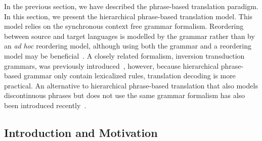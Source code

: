 \begin{sloppy} %

In the previous section, we have described the
phrase-based translation paradigm.
In this section, we present the
hierarchical phrase-based translation
model. This model relies on the synchronous
context free grammar formalism. Reordering
between source and target languages is modelled
by the grammar rather than by an \emph{ad} \emph{hoc}
reordering model, although using both the grammar
and a reordering model may be
beneficial~\citep{huck-EtAl:2013:WMT}.
A closely related formalism, inversion
transduction grammars, was previously
introduced~\citep{wu:1995:IJCAI,wu:1997:CL}, however, because hierarchical
phrase-based grammar only contain lexicalized rules, translation decoding
is more practical.
An alternative to hierarchical phrase-based
translation that also models discontinuous
phrases but does not use the same grammar
formalism has also been introduced
recently~\citep{galley-manning:2010:NAACLHLT}.

\end{sloppy}

\subsection{Introduction and Motivation}
\label{sec:hierintro}

